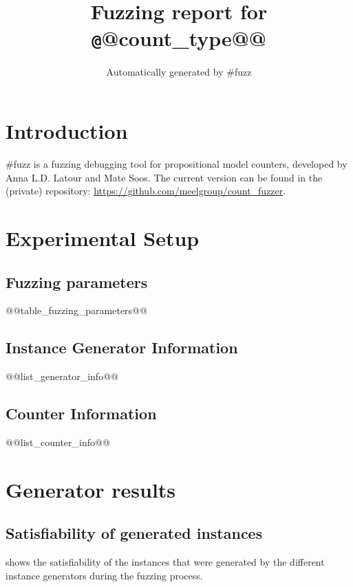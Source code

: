 \documentclass[british]{article}
\title{Fuzzing report for {\texttt @@count_type@@} }
\author{Automatically generated by {\sf $\#$fuzz}}
\begin{document}
\maketitle %

\section{Introduction}
\label{sec:introduction}

{\sf $\#$fuzz} is a fuzzing debugging tool for propositional model counters, developed by Anna L.D. Latour and Mate Soos.
The current version can be found in the (private) repository: \url{https://github.com/meelgroup/count_fuzzer}.

\section{Experimental Setup}
\label{sec:experimental-setup}

\subsection{Fuzzing parameters}
\label{subsec:fuzzing-parameters}

\begin{table}[ht]
    \begin{center}
    \caption{Fuzzing parameters.}
    \label{tab:fuzzing-parameters}
@@table_fuzzing_parameters@@
    \end{center}
\end{table}

\subsection{Instance Generator Information}
\label{subsec:instance-generator-information}

@@list_generator_info@@

\subsection{Counter Information}
\label{subsec:counter-information}

@@list_counter_info@@

\section{Generator results}
\label{sec:generator-results}


\subsection{Satisfiability of generated instances}
 shows the satisfiability of the instances that were generated by the different instance generators during the fuzzing process.
\end{document}
